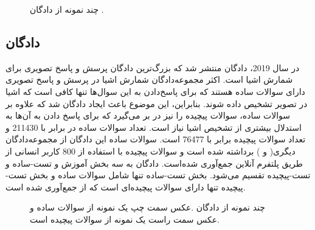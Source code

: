    \begin{figure}
   	\caption[چند نمونه از ‌دادگان]{چند نمونه از ‌دادگان \cite{johnson2017clevr}.}
   	\label{fig:CLEVRExample}
   \end{figure}

\subsection{ دادگان }

	در سال 2019، ‌دادگان 
   \cite{acharya2019tallyqa}
منتشر شد که بزرگ‌ترین ‌دادگان پرسش و پاسخ تصویری برای شمارش اشیا است. اکثر مجموعه‌دادگان شمارش اشیا در پرسش و پاسخ تصویری دارای سوالات ساده هستند که برای پاسخ‌دادن به این سوال‌‌ها تنها کافی است که اشیا در تصویر تشخیص ‌داده ‌شوند. بنابراین، این موضوع باعث ایجاد دادگان 
  شد که علاوه بر سوالات ساده، سوالات پیچیده را نیز در بر می‌گیرد که برای پاسخ دادن به آن‌ها به استدلال بیشتری از تشخیص اشیا نیاز است. تعداد سوالات ساده در
  برابر با 211430 و تعداد سوالات پیچیده برابر با 76477 است. سوالات ساده این ‌دادگان از مجموعه‌دادگان دیگری( 
   \cite{goyal2017making}
  و 
   \cite{krishna2017visual}
  ) برداشته ‌شده ‌است و سوالات پیچیده با استفاده از 800 کاربر انسانی از طریق پلتفرم آنلاین 
  جمع‌آوری شده‌است. ‌دادگان 
  به سه بخش آموزش و تست-ساده و تست-پیچیده تقسیم می‌شود. بخش تست-ساده تنها شامل سوالات ساده و بخش تست-پیچیده تنها دارای سوالات پیچیده‌ای است که از 
  جمع‌آوری شده ‌است. 

   \begin{figure}
		\caption[چند نمونه از ‌دادگان]{چند نمونه از ‌دادگان  \cite{acharya2019tallyqa}.عکس سمت چپ یک نمونه از سوالات ساده و عکس سمت راست یک نمونه از سوالات پیچیده است.}
		\label{fig:TallyQAExample}
	\end{figure}

